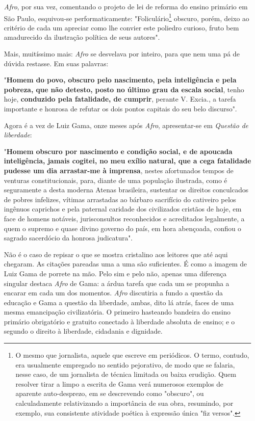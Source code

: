 \emph{Afro}, por sua vez, comentando o projeto de lei de reforma do
ensino primário em São Paulo, esquivou-se performaticamente:
"Foliculário\footnote{O mesmo que jornalista, aquele que escreve em
  periódicos. O termo, contudo, era usualmente empregado no sentido
  pejorativo, de modo que se falaria, nesse caso, de um jornalista de
  técnica limitada ou baixa erudição. Quem resolver tirar a limpo a
  escrita de Gama verá numerosos exemplos de aparente auto-desprezo, em
  se descrevendo como "obscuro", ou calculadamente relativizando a
  importância de sua obra, resumindo, por exemplo, sua consistente
  atividade poética à expressão única "fiz versos".} obscuro, porém,
deixo ao critério de cada um apreciar como lhe convier este poliedro
curioso, fruto bem amadurecido da ilustração política de seus autores".

Mais, muitíssimo mais: \emph{Afro} se desvelava por inteiro, para que
nem uma pá de dúvida restasse. Em suas palavras:

"\textbf{Homem do povo, obscuro pelo nascimento, pela inteligência e
pela pobreza, que não detesto, posto no último grau da escala social},
tenho hoje, \textbf{conduzido pela fatalidade, de cumprir}, perante V.
Excia., a tarefa importante e honrosa de refutar os dois pontos capitais
do seu belo discurso".

Agora é a vez de Luiz Gama, onze meses após \emph{Afro}, apresentar-se
em \emph{Questão de liberdade}:

"\textbf{Homem obscuro por nascimento e condição social, e de apoucada
inteligência, jamais cogitei, no meu exílio natural, que a cega
fatalidade pudesse um dia arrastar-me à imprensa}, nestes afortunados
tempos de venturas constitucionais, para, diante de uma população
ilustrada, como é seguramente a desta moderna Atenas brasileira,
sustentar os direitos conculcados de pobres infelizes, vítimas
arrastadas ao bárbaro sacrifício do cativeiro pelos ingênuos caprichos e
pela paternal caridade dos civilizados cristãos de hoje, em face de
homens notáveis, jurisconsultos reconhecidos e acreditados legalmente, a
quem o supremo e quase divino governo do país, em hora abençoada,
confiou o sagrado sacerdócio da honrosa judicatura".

Não é o caso de repisar o que se mostra cristalino aos leitores que até
aqui chegaram. As citações pareadas uma a uma são suficientes. É como a
imagem de Luiz Gama de porrete na mão. Pelo sim e pelo não, apenas uma
diferença singular destaca \emph{Afro} de Gama: a árdua tarefa que cada
um se propunha a encarar em cada um dos momentos. \emph{Afro} discutiria
a fundo a questão da educação e Gama a questão da liberdade, ambas, dito
lá atrás, faces de uma mesma emancipação civilizatória. O primeiro
hasteando bandeira do ensino primário obrigatório e gratuito conectado à
liberdade absoluta de ensino; e o segundo o direito à liberdade,
cidadania e dignidade.

